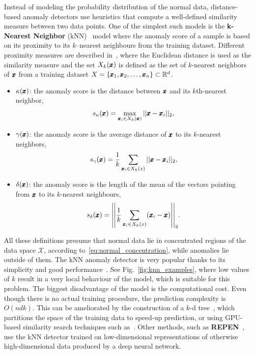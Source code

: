 Instead of modeling the probability distribution of the normal data, distance-based anomaly detectors use heuristics that compute a well-defined similarity measure between two data points. One of the simplest such models is the \textbf{k-Nearest Neighbor} (kNN)~\cite{ramaswamy2000efficient} model where the anomaly score of a sample is based on its proximity to its $k$--nearest neighbours from the training dataset. Different proximity measures are described in~\cite{harmeling2006outliers}, where 
the Euclidean distance is used as the similarity measure and the set $X_{k}(\pmb{{x}})$ is defined as the set of $k$-nearest neighbors of $\pmb{{x}}$ from a training dataset $X = \lbrace \pmb{{x}}_1, \pmb{{x}}_2, \ldots, \pmb{{x}}_n \rbrace \subset \mathbb{R}^d$.
\begin{itemize}
	\item $\kappa(\pmb{{x}})$: the anomaly score is the distance between $\pmb{{x}}$ and its $k$th-nearest neighbor,
	\begin{equation} \label{eq:knn_kappa}
		s_{\kappa}(\pmb{{x}}) =  \max_{\pmb{{x}}_i \in X_k(\pmb{{x}})} \vert \vert \pmb{{x}} - \pmb{{x}}_i \vert \vert_2,
	\end{equation}
	\item $\gamma(\pmb{{x}})$: the anomaly score is the average distance of $\pmb{{x}}$ to its $k$-nearest neighbors, 
	\begin{equation} \label{eq:knn_gamma}
		s_{\gamma}(\pmb{{x}}) =  \frac{1}{k} \sum_{\pmb{{x}}_i \in X_k(x)} \vert \vert \pmb{{x}} - \pmb{{x}}_i \vert \vert_2,
	\end{equation}
	\item $\delta(\pmb{{x}})$: the anomaly score is the length of the mean of the vectors pointing from $\pmb{{x}}$ to its $k$-nearest neighbours,
	\begin{equation} \label{eq:knn_delta}
		s_{\delta}(\vc{x}) =  \left| \left| \frac{1}{k} \sum_{\vc{x}_i \in X_k(x)} (\vc{x}_i - \vc{x}) \right| \right|_2.
	\end{equation}
\end{itemize}
All these definitions presume that normal data lie in concentrated regions of the data space $\mathcal{X}$, according to~\eqref{eq:normal_concentration}, while anomalies lie outside of them. The kNN anomaly detector is very popular thanks to its simplicity and good performance~\cite{campos2016evaluation}. See Fig.~\ref{fig:knn_examples}, where low values of $k$ result in a very local behaviour of the model, which is suitable for this problem. The biggest disadvantage of the model is the computational cost. Even though there is no actual training procedure, the prediction complexity is $O(ndk)$. This can be ameliorated by the construction of a $k$-d tree~\cite{bentley1975multidimensional}, which partitions the space of the training data to speed-up prediction, or using GPU-based similarity search techniques such as~\cite{johnson2019billion}. Other methods, such as \textbf{REPEN}~\cite{pangLearningRepresentationsUltrahighdimensional2018}, use the kNN detector trained on low-dimensional representations of otherwise high-dimensional data produced by a deep neural network.

